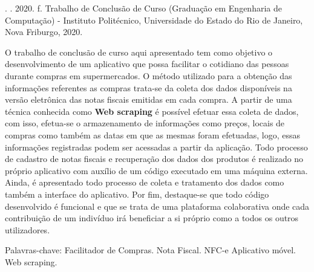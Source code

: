\begin{resumo}

\noindent
\entradaAutor{}. \textit{\imprimirtitulo}. 2020. \pageref{LastPage} f. Trabalho de Conclusão de Curso (Graduação em Engenharia de Computação) - Instituto Politécnico, Universidade do Estado do Rio de Janeiro, Nova Friburgo, 2020.
\vspace{\onelineskip}

\setlength{\parindent}{1.3cm}
O trabalho de conclusão de curso aqui apresentado tem como objetivo o desenvolvimento de um aplicativo que possa facilitar o cotidiano das pessoas durante compras em supermercados. O método utilizado para a obtenção das informações referentes as compras trata-se da coleta dos dados disponíveis na versão eletrônica das notas fiscais emitidas em cada compra. A partir de uma técnica conhecida como \textbf{Web scraping} é possível efetuar essa coleta de dados, com isso, efetua-se o armazenamento de informações como preços, locais de compras como também as datas em que as mesmas foram efetuadas, logo, essas informações registradas podem ser acessadas a partir da aplicação. Todo processo de cadastro de notas fiscais e recuperação dos dados dos produtos é realizado no próprio aplicativo com auxílio de um código executado em uma máquina externa. Ainda, é apresentado todo processo de coleta e tratamento dos dados como também a interface do aplicativo. Por fim, destaque-se que todo código desenvolvido é funcional e que se trata de uma plataforma colaborativa onde cada contribuição de um indivíduo irá beneficiar a si próprio como a todos os outros utilizadores.

\vspace{\onelineskip}
\noindent Palavras-chave: Facilitador de Compras. Nota Fiscal. NFC-e Aplicativo móvel. Web scraping.

\end{resumo}